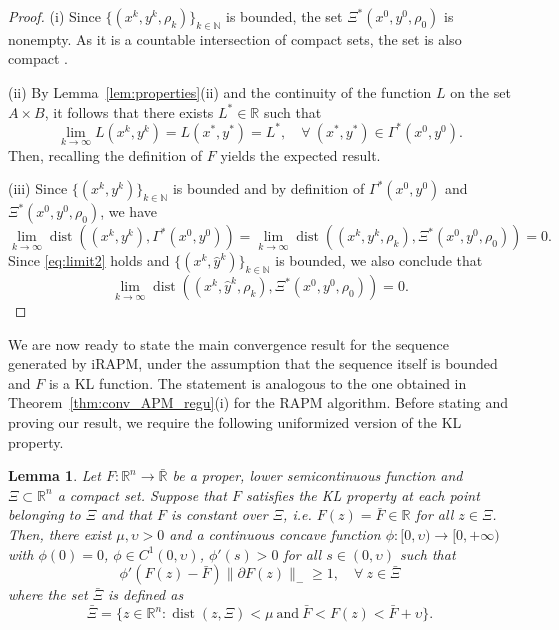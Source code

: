 \documentclass[pdflatex,sn-mathphys-num]{sn-jnl}
\numberwithin{equation}{section}%
\def\R{\mathbb{R}}
\def\N{\mathbb{N}}
\def\bR{\bar{\mathbb{R}}}
\theoremstyle{thmstyleone}%
\newtheorem{lemma}[theorem]{Lemma}%
\theoremstyle{thmstyletwo}%
\theoremstyle{thmstylethree}%
\begin{document}
{\begin{proof}
(i) Since $\{(x^k,y^k,\rho_k)\}_{k\in\N}$ is bounded, the set $\Xi^*(x^0,y^0,\rho_0)$ is nonempty. As it is a countable intersection of compact sets, the set is also compact \cite[Lemma 5]{Bolte-etal-2014}.

(ii) By Lemma~\ref{lem:properties}(ii) and the continuity of the function $L$ on the set $A\times B$, it follows that there exists $L^*\in\R$ such that
\begin{equation}\label{eq:limL}
    \lim_{k\rightarrow \infty}L(x^k,y^k)=L(x^*,y^*)=L^*,\quad\forall \ (x^*,y^*)\in \Gamma^*(x^0,y^0).
\end{equation}
Then, recalling the definition of $F$ yields the expected result.

(iii) Since $\{(x^k,y^k)\}_{k\in\N}$ is bounded and by definition of $\Gamma^*(x^0,y^0)$ and $\Xi^*(x^0,y^0,\rho_0)$, we have
\begin{equation*}
    \lim_{k\rightarrow \infty}\operatorname{dist}((x^k,y^k),\Gamma^*(x^0,y^0))=\lim_{k\rightarrow \infty}\operatorname{dist}((x^k,y^k,\rho_k),\Xi^*(x^0,y^0,\rho_0))=0.
\end{equation*}
Since  \eqref{eq:limit2} holds and $\{(x^k,\hat{y}^k)\}_{k\in\N}$ is bounded, we also conclude that 
$$
\lim_{k\rightarrow \infty}\operatorname{dist}((x^k,\hat{y}^k,\rho_k),\Xi^*(x^0,y^0,\rho_0))=0.
$$
\end{proof}}
We are now ready to state the main convergence result for the sequence generated by iRAPM, under the assumption that the sequence itself is bounded and $F$ is a KL function. The statement is analogous to the one obtained in Theorem~\ref{thm:conv_APM_regu}(i) for the RAPM algorithm. Before stating and proving our result, we require the following uniformized version of the KL property.

\begin{lemma}\label{lemma:UKL} \cite[Lemma 6]{Bolte-etal-2014}
    Let $F:\R^n\to \bR$ be a proper, lower semicontinuous function and $\Xi\subset \R^n$ a compact set. Suppose that $F$ satisfies the KL property at each point belonging to $\Xi$ and that $F$ is constant over $\Xi$, i.e. $F(z) = \bar{F}\in \R$ for all $z \in \Xi$. Then, there exist $\mu,\upsilon>0$ and a continuous concave function $\phi:[0,\upsilon)\longrightarrow [0,+\infty)$ with $\phi(0) = 0$, $\phi\in C^1(0,\upsilon)$, $\phi'(s) > 0$ for all $s \in (0,\upsilon)$ such that 
    \begin{equation}\label{UKL}
        \phi'(F(z)-\bar{F}) \|\partial F(z)\|_- \geq 1, \quad  \forall \ z\in \bar \Xi 
    \end{equation} 
    where the set $\bar \Xi$ is defined as
    \begin{equation}\label{UKLbound}
        \bar \Xi = \{z\in\R^n: \operatorname{dist}(z,\Xi)<\mu \ \text{and} \ \bar F < F(z) < \bar{F} + \upsilon\}.
    \end{equation}
\end{lemma}
\end{document}
